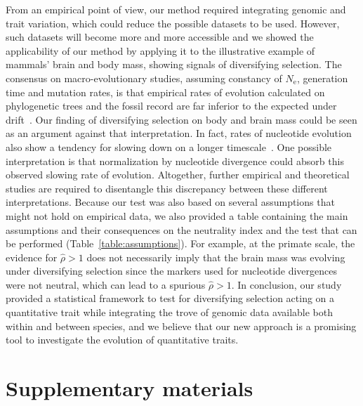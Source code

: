 \documentclass{article}
\newcommand{\Ne}{N_{\text{e}}}
\newcommand{\EstNI}{\widehat{\rho}}
\begin{document}
From an empirical point of view, our method required integrating genomic and trait variation, which could reduce the possible datasets to be used.
However, such datasets will become more and more accessible and we showed the applicability of our method by applying it to the illustrative example of mammals' brain and body mass, showing signals of diversifying selection.
The consensus on macro-evolutionary studies, assuming constancy of $\Ne$, generation time and mutation rates, is that empirical rates of evolution calculated on phylogenetic trees and the fossil record are far inferior to the expected under drift~\citep{lynch_analysis_1990, uyeda_millionyear_2011}.
Our finding of diversifying selection on body and brain mass could be seen as an argument against that interpretation. In fact, rates of nucleotide evolution also show a tendency for slowing down on a longer timescale~\citep{rolland_conceptual_2023}.
One possible interpretation is that normalization by nucleotide divergence could absorb this observed slowing rate of evolution.
Altogether, further empirical and theoretical studies are required to disentangle this discrepancy between these different interpretations.
Because our test was also based on several assumptions that might not hold on empirical data, we also provided a table containing the main assumptions and their consequences on the neutrality index and the test that can be performed (Table~\ref{table:assumptions}).
For example, at the primate scale, the evidence for $\EstNI > 1$ does not necessarily imply that the brain mass was evolving under diversifying selection since the markers used for nucleotide divergences were not neutral, which can lead to a spurious $\EstNI > 1$.
In conclusion, our study provided a statistical framework to test for diversifying selection acting on a quantitative trait while integrating the trove of genomic data available both within and between species, and we believe that our new approach is a promising tool to investigate the evolution of quantitative traits.





\newpage

\part*{Supplementary materials}
\renewcommand{\thetable}{S\arabic{table}}
\renewcommand{\thefigure}{S\arabic{figure}}
\setcounter{figure}{0}
\setcounter{table}{0}
\setcounter{section}{0}
\end{document}

